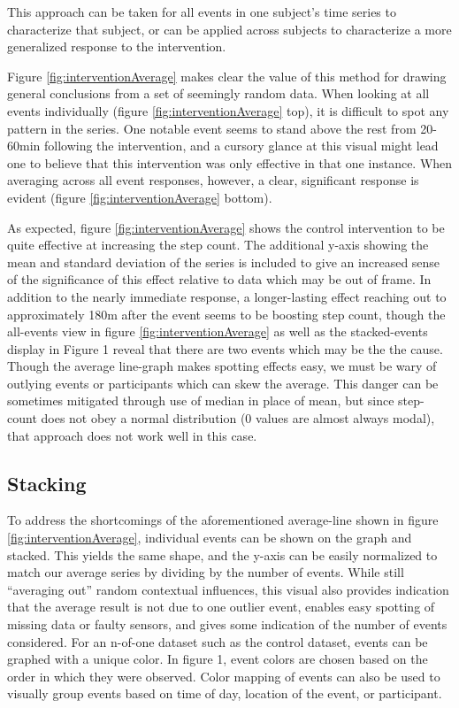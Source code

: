 \documentclass[review,journal]{vgtc}         %
\begin{document}
This approach can be taken for all events in one subject's time series to characterize that subject, or can be applied across subjects to characterize a more generalized response to the intervention.

Figure \ref{fig:interventionAverage} makes clear the value of this method for drawing general conclusions from a set of seemingly random data.
When looking at all events individually (figure \ref{fig:interventionAverage} top), it is difficult to spot any pattern in the series.
One notable event seems to stand above the rest from 20-60min following the intervention, and a cursory glance at this visual might lead one to believe that this intervention was only effective in that one instance.
When averaging across all event responses, however, a clear, significant response is evident (figure \ref{fig:interventionAverage} bottom).

As expected, figure \ref{fig:interventionAverage} shows the control intervention to be quite effective at increasing the step count.
The additional y-axis showing the mean and standard deviation of the series is included to give an increased sense of the significance of this effect relative to data which may be out of frame.
In addition to the nearly immediate response, a longer-lasting effect reaching out to approximately 180m after the event seems to be boosting step count, though the all-events view in figure \ref{fig:interventionAverage} as well as the stacked-events display in Figure 1 reveal that there are two events which may be the the cause.
Though the average line-graph makes spotting effects easy, we must be wary of outlying events or participants which can skew the average.
This danger can be sometimes mitigated through use of median in place of mean, but since step-count does not obey a normal distribution (0 values are almost always modal), that approach does not work well in this case.

\subsection{Stacking}
To address the shortcomings of the aforementioned average-line shown in figure \ref{fig:interventionAverage}, individual events can be shown on the graph and stacked.
This yields the same shape, and the y-axis can be easily normalized to match our average series by dividing by the number of events.
While still “averaging out” random contextual influences, this visual also provides indication that the average result is not due to one outlier event, enables easy spotting of missing data or faulty sensors, and gives some indication of the number of events considered.
For an n-of-one dataset such as the control dataset, events can be graphed with a unique color.
In figure 1, event colors are chosen based on the order in which they were observed.
Color mapping of events can also be used to visually group events based on time of day, location of the event, or participant.
\end{document}
